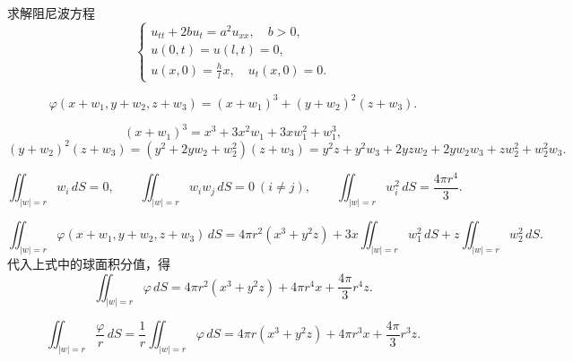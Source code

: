 \begin{homework}
[6] 求解阻尼波方程
\[
\begin{cases}
u_{tt}+2bu_t=a^{2}u_{xx},\quad b>0,\\[3pt]
u(0,t)=u(l,t)=0,\\[3pt]
u(x,0)=\frac{h}{l}x,\quad u_t(x,0)=0.
\end{cases}
\]
\end{homework}


\[
\varphi(x+w_1,y+w_2,z+w_3)
=(x+w_1)^3+(y+w_2)^2(z+w_3).
\]

\[
(x+w_1)^3=x^3+3x^2w_1+3xw_1^2+w_1^3,
\]
\[
(y+w_2)^2(z+w_3)=(y^2+2yw_2+w_2^2)(z+w_3)
= y^2z+y^2w_3+2yzw_2+2yw_2w_3+zw_2^2+w_2^2w_3.
\]

\[
\iint_{|w|=r} w_i\,dS=0,\qquad
\iint_{|w|=r} w_iw_j\,dS=0\ (i\ne j),\qquad
\iint_{|w|=r} w_i^2\,dS=\frac{4\pi r^4}{3}.
\]

\[
\iint_{|w|=r}\varphi(x+w_1,y+w_2,z+w_3)\,dS
=4\pi r^2(x^3+y^2z)+3x\iint_{|w|=r}w_1^2\,dS
+z\iint_{|w|=r}w_2^2\,dS.
\]
代入上式中的球面积分值，得
\[
\iint_{|w|=r}\varphi\,dS
=4\pi r^2(x^3+y^2z)+4\pi r^4 x+\frac{4\pi}{3}r^4 z.
\]

\[
\iint_{|w|=r}\frac{\varphi}{r}\,dS
=\frac{1}{r}\iint_{|w|=r}\varphi\,dS
=4\pi r(x^3+y^2z)+4\pi r^3x+\frac{4\pi}{3}r^3z.
\]
